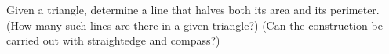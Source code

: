 Given a triangle, determine a line that halves both its area and its perimeter.
\newline (How many such lines are there in a given triangle?)
(Can the construction be carried out with straightedge and compass?)
